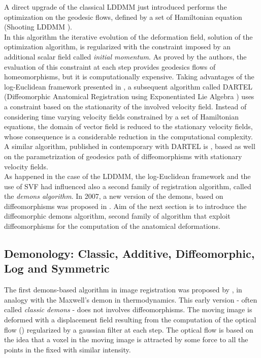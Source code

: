 A direct upgrade of the classical LDDMM just introduced performs the optimization on the geodesic flows, defined by a set of Hamiltonian equation (Shooting LDDMM \cite{vialard2012diffeomorphic}). \\
In this algorithm the iterative evolution of the deformation field, solution of the optimization algorithm, is regularized with the constraint imposed by an additional scalar field called \emph{initial momentum}. 
As proved by the authors, the evaluation of this constraint at each step provides geodesics flows of homeomorphisms, but it is computationally expensive. Taking advantages of the log-Euclidean framework presented in \cite{Arsigny:MRM:06}, a subsequent algorithm called DARTEL (Diffeomorphic Anatomical Registration using Exponentiated Lie Algebra \cite{Ashburner:07}) uses a constraint based on the stationarity of the involved velocity field. Instead of considering time varying velocity fields constrained by a set of Hamiltonian equations, the domain of vector field is reduced to the stationary velocity fields, whose consequence is a considerable reduction in the computational complexity. A similar algorithm, published in contemporary with DARTEL is \cite{hernandez2007registration}, based as well on the parametrization of geodesics path of diffeomorphisms with stationary velocity fields. \\

As happened in the case of the LDDMM, the log-Euclidean framework and the use of SVF had influenced also a second family of registration algorithm, called the \emph{demons algorithm}. In 2007, a new version of the demons, based on diffeomorphisms was proposed in \cite{vercauteren2006robust}. Aim of the next section is to introduce the diffeomorphic demons algorithm, second family of algorithm that exploit diffeomorphisms for the computation of the anatomical deformations.


\subsection{Demonology: Classic, Additive, Diffeomorphic, Log and Symmetric}

The first demons-based algorithm in image registration was proposed by \cite{thirion1998image}, in analogy with the Maxwell's demon in thermodynamics. This early version - often called \emph{classic demons} - does not involves diffeomorphisms. 
The moving image is deformed with a displacement field resulting from the computation of the optical flow (\cite{horn1981determining}) regularized by a gaussian filter at each step. The optical flow is based on the idea that a voxel in the moving image is attracted by some force to all the points in the fixed with similar intensity. \\

